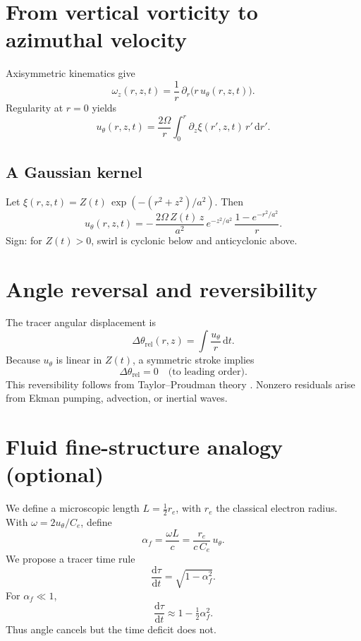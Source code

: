 \documentclass[12pt]{article}
\newcommand{\dd}{\mathrm{d}}
\newcommand{\p}{\partial}
\newcommand{\Ce}{C_e} %
\newcommand{\re}{r_e} %
\begin{document}
    \section{From vertical vorticity to azimuthal velocity}
    Axisymmetric kinematics give
    \begin{equation}
        \omega_z(r,z,t)=\frac{1}{r}\,\p_r\!\big(r\,u_\theta(r,z,t)\big). \label{eq:omegau}
    \end{equation}
    Regularity at \(r=0\) yields
    \begin{equation}
        \boxed{\;
        u_\theta(r,z,t)
            =\frac{2\Omega}{r}\int_0^r \p_z\xi(r',z,t)\,r'\,\dd r'.\;} \label{eq:uth}
    \end{equation}

    \subsection{A Gaussian kernel}
    Let
    \(\xi(r,z,t)=Z(t)\,\exp(-(r^2+z^2)/a^2)\).
    Then
    \begin{equation}
        \boxed{\;
        u_\theta(r,z,t)
            = -\,\frac{2\Omega\,Z(t)\,z}{a^{2}}\,e^{-z^{2}/a^{2}}\,
            \frac{1-e^{-r^{2}/a^{2}}}{r}.
            \;} \label{eq:uth_gauss}
    \end{equation}
    Sign: for \(Z(t)>0\), swirl is cyclonic below and anticyclonic above.

    \section{Angle reversal and reversibility}
    The tracer angular displacement is
    \[
        \Delta \theta_\text{rel}(r,z)=\int \frac{u_\theta}{r}\,\dd t.
    \]
    Because \(u_\theta\) is linear in \(Z(t)\), a symmetric stroke implies
    \[
        \boxed{\;\Delta \theta_\text{rel}=0\quad\text{(to leading order).}\;}
    \]
    This reversibility follows from Taylor--Proudman theory \cite{Proudman1916,Taylor1923,Greenspan1968}. Nonzero residuals arise from Ekman pumping, advection, or inertial waves.

    \section{Fluid fine-structure analogy (optional)}
    We define a microscopic length \(L=\tfrac{1}{2}\re\), with \(\re\) the classical electron radius. With $\omega=2u_\theta/\Ce$, define
    \begin{equation}
        \boxed{\;\alpha_f = \frac{\omega L}{c}
            = \frac{\re}{c\,\Ce}\,u_\theta.\;}
    \end{equation}
    We propose a tracer time rule
    \begin{equation}
        \frac{\dd \tau}{\dd t} = \sqrt{1-\alpha_f^2}.
    \end{equation}
    For $\alpha_f\ll1$,
    \[
        \frac{\dd \tau}{\dd t}\approx 1-\tfrac{1}{2}\alpha_f^2.
    \]
    Thus angle cancels but the time deficit does not.
\end{document}
